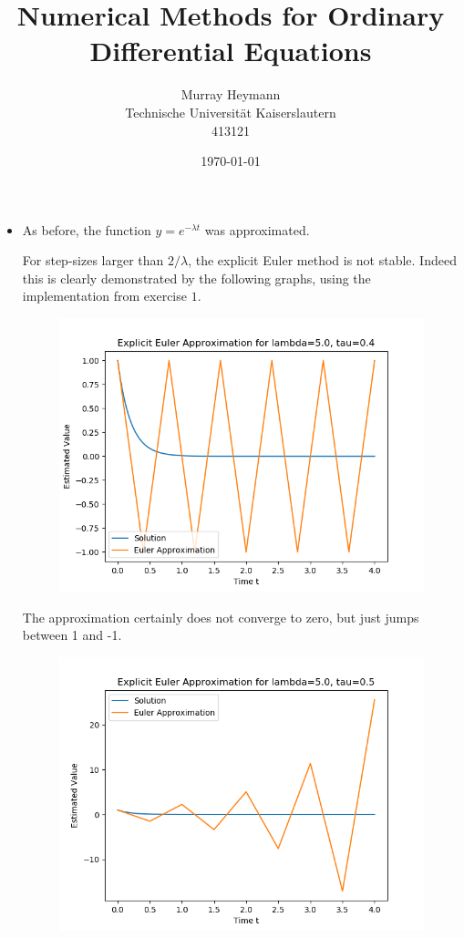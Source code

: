 \documentclass{article}
\title{Numerical Methods for Ordinary Differential Equations}
\author{Murray Heymann \\
	Technische Universit{\"a}t Kaiserslautern \\
	413121}
\date{\today}
\theoremstyle{definition}
\begin{document}
\maketitle


\setcounter{section}{2}
\section{}
\subsection{}

\begin{itemize}
	\item[(a)]
		As before, the function $y = e^{- \lambda t}$ was approximated.

		For step-sizes larger than $2/\lambda$, the explicit Euler method
		is not stable.  Indeed this is clearly demonstrated by the
		following graphs, using the implementation from exercise $1$.
		\begin{figure}[H]
			\includegraphics[scale=0.6]{explicit_euler_04}
		\end{figure}
		The approximation certainly does not
		converge to zero, but just jumps between 1 and -1.
		\begin{figure}[H]
			\includegraphics[scale=0.6]{explicit_euler_05}

\end{figure}
\end{itemize}
\end{document}
